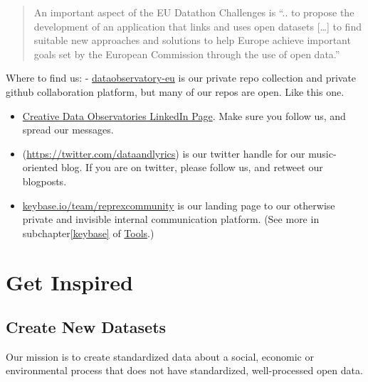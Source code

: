 \documentclass[
  a4paper,
  openany, a4paper, oneside]{book}
\begin{document}
\begin{quote}
An important aspect of the EU Datathon Challenges is ``.. to propose the development of an application that links and uses open datasets {[}\ldots{]} to find suitable new approaches and solutions to help Europe achieve important goals set by the European Commission through the use of open data.''
\end{quote}

Where to find us:
- \href{https://github.com/dataobservatory-eu}{dataobservatory-eu} is our private repo collection and private github collaboration platform, but many of our repos are open. Like this one.

\begin{itemize}
\item
  \href{https://www.linkedin.com/company/reprexbv/}{Creative Data Observatories LinkedIn Page}. Make sure you follow us, and spread our messages.
\item
  \citep{dataandlyrics}(\url{https://twitter.com/dataandlyrics}) is our twitter handle for our music-oriented blog. If you are on twitter, please follow us, and retweet our blogposts.
\item
  \href{https://keybase.io/team/reprexcommunity}{keybase.io/team/reprexcommunity} is our landing page to our otherwise private and invisible internal communication platform. (See more in subchapter\ref{keybase} of \protect\hyperlink{keybase}{Tools}.)
\end{itemize}

\hypertarget{get-inspired}{%
\section{Get Inspired}\label{get-inspired}}

\hypertarget{create-new-datasets}{%
\subsection{Create New Datasets}\label{create-new-datasets}}

Our mission is to create standardized data about a social, economic or environmental process that does not have standardized, well-processed open data.
\end{document}
